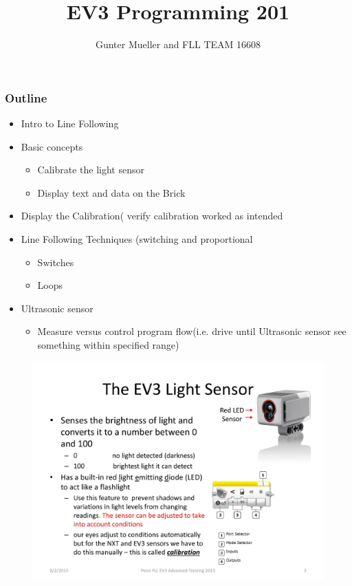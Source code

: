 \documentclass[11pt]{beamer}
\author{Gunter Mueller and FLL TEAM 16608}
\title{EV3 Programming 201}
\begin{document}
\begin{frame}
\titlepage
\end{frame}\maketitle



\begin{frame}
\frametitle{Outline}
\begin{itemize}
\item Intro to Line Following
\item  Basic concepts
\begin{itemize}
\item Calibrate the light sensor
\item Display text and data on the Brick
\end{itemize}
\item Display the Calibration( verify calibration worked as intended
\item Line Following Techniques (switching and proportional
\begin{itemize}
\item Switches
\item Loops
\end{itemize}
\item Ultrasonic sensor
\begin{itemize}
\item  Measure versus control program flow(i.e. drive until Ultrasonic sensor see something within specified range)
\end{itemize}

\end{itemize}
\end{frame}



\begin{frame}
\begin{figure}
\includegraphics[scale=0.4]{ev3advanced2015/file-page3}
\end{figure}
\end{frame}
\end{document}
